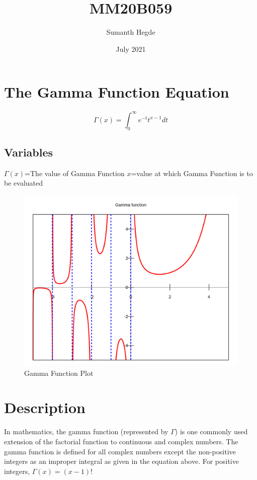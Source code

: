 \documentclass{article}
\title{MM20B059}
\author{Sumanth Hegde}
\date{July 2021}
\begin{document}
\maketitle

\section{The Gamma Function Equation}
{\Large$$\Gamma(x)=\int_{0}^{\infty}e^{-t}t^{x-1}dt$$}
\subsection{Variables}
$\Gamma(x)$=The value of Gamma Function\newline
$x$=value at which Gamma Function is to be evaluated
\begin{figure}[h!]
\centering
\includegraphics[scale=0.23]{gamma.png}
\caption{Gamma Function Plot}
\label{fig:gamma}
\end{figure}

\section{Description}
In mathematics, the gamma function (represented by $\Gamma$) is one commonly used extension of the factorial function to continuous and complex numbers. The gamma function is defined for all complex numbers except the non-positive integers as an improper integral as given in the equation above. For positive integers, $\Gamma(x)=(x-1)!$~\cite{enwiki:1029050612}



\end{document}
